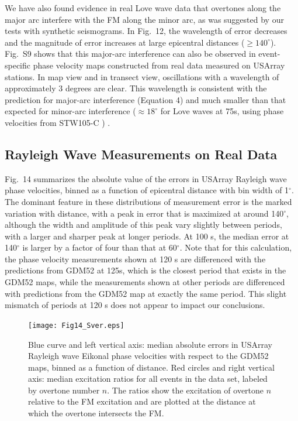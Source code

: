 \documentclass[extra,mreferee]{gji}
\begin{document}
We have also found evidence in real Love wave data that overtones along the major arc interfere with the FM along the minor arc, as was suggested by our tests with synthetic seismograms. In Fig.\ 12, the wavelength of error decreases and the magnitude of error increases at large epicentral distances ($ \geq 140^\circ$). Fig.\ S9 shows that this major-arc interference can also be observed in event-specific phase velocity maps constructed from real data measured on USArray stations. In map view and in transect view, oscillations with a wavelength of approximately 3 degrees are clear. This wavelength is consistent with the prediction for major-arc interference (Equation 4) and much smaller than that expected for minor-arc interference ($\approx 18 ^\circ$ for Love waves at 75s, using phase velocities from STW105-C ) .     


 \subsection{Rayleigh Wave Measurements on Real Data}

Fig.\ 14 summarizes the absolute value of the errors in USArray Rayleigh wave phase velocities, binned as a function of epicentral distance with bin width of 1$^\circ$. The dominant feature in these distributions of measurement error is the marked variation with distance, with a peak in error that is maximized at around 140$^\circ$, although the width and amplitude of this peak vary slightly between periods, with a larger and sharper peak at longer periods. At 100 s, the median error at 140$^\circ$ is larger by a factor of four than that at 60$^\circ$. Note that for this calculation, the phase velocity measurements shown at 120 s are differenced with the predictions from GDM52 at 125s, which is the closest period that exists in the GDM52 maps, while the measurements shown at other periods are differenced with predictions from the GDM52 map at exactly the same period. This slight mismatch of periods at 120 s does not appear to impact our conclusions.

\begin{figure}
\texttt{[image: Fig14\_Sver.eps]}
\caption{Blue curve and left vertical axis: median absolute errors in USArray Rayleigh wave Eikonal phase velocities with respect to the GDM52 maps, binned as a function of distance. Red circles and right vertical axis: median excitation ratios for all events in the data set, labeled by overtone number $n$. The ratios show the excitation of overtone $n$ relative to the FM excitation and are plotted at the distance at which the overtone intersects the FM. }
\end{figure}
\end{document}
